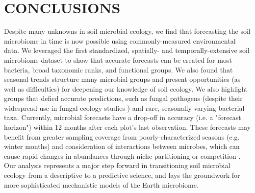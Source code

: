 \documentclass[11pt]{article}
\begin{document}
\section{CONCLUSIONS}

Despite many unknowns in soil microbial ecology, we find that forecasting the soil microbiome in time is now possible using commonly-measured environmental data. We leveraged the first standardized, spatially- and temporally-extensive soil microbiome dataset to show that accurate forecasts can be created for most bacteria, broad taxonomic ranks, and functional groups. We also found that seasonal trends structure many microbial groups and present opportunities (as well as difficulties) for deepening our knowledge of soil ecology. We also highlight groups that defied accurate predictions, such as fungal pathogens (despite their widespread use in fungal ecology studies \cite{zanne_fungal_2020,polme_fungaltraits_2020,hoeksema_ectomycorrhizal_2020}) and rare, seasonally-varying bacterial taxa. Currently, microbial forecasts have a drop-off in accuracy (i.e. a "forecast horizon") within 12 months after each plot's last observation. These forecasts may benefit from greater sampling coverage from poorly-characterized seasons (e.g. winter months) and consideration of interactions between microbes, which can cause rapid changes in abundances through niche partitioning or competition \cite{kramer_resource_2016,maynard_species_2018}.  Our analysis represents a major step forward in transitioning soil microbial ecology from a descriptive to a predictive science, and lays the groundwork for more sophisticated mechanistic models of the Earth microbiome.

 
\end{document}
